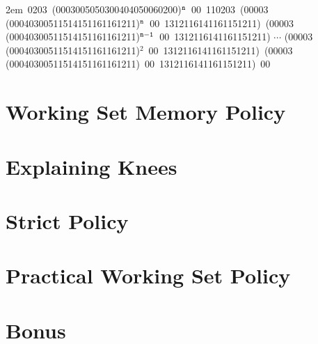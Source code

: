\documentclass[12pt,letterpaper]{article}
\begin{document}
\vspace{2ex}

\hangindent2em \,0203 \,(0003005050300404050060200)$\tt ^n$ \,00 \,110203 \,(00003 \,(00040300511514151161161211)$\tt ^n$ \,00 \,1312116141161151211) \,(00003 \,(00040300511514151161161211)$\tt ^{n-1}$ \,00 \,1312116141161151211) $\cdots$ (00003 \,(00040300511514151161161211)$^2$ \,00 \,1312116141161151211) \,(00003 \,(00040300511514151161161211) \,00 \,1312116141161151211) \,00

%

\section{Working Set Memory Policy}

\section{Explaining Knees}

\section{Strict Policy}

\section{Practical Working Set Policy}

\section*{Bonus}
\end{document}
